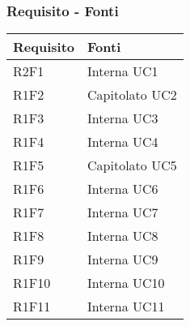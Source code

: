 \subsubsection{Requisito - Fonti}
\begin{center}
	\begin{longtable}{|p{22mm}|p{44mm}|}
		\hline
		\rowcolor{lighter-grayer}
		\textbf{Requisito} &  \textbf{Fonti}  \\
		\hline
		\endhead
		
		
		
		R2F1 &
		Interna \newline
		UC1 
		\\
		\hline
		
		R1F2 &
		Capitolato \newline
		UC2 
		\\
		\hline
		
		R1F3 &
		Interna \newline
		UC3 
		\\
		\hline
		
		R1F4 &
		Interna \newline
		UC4 
		\\
		\hline
		
		R1F5 &
		Capitolato \newline
		UC5 
		\\
		\hline
		
		R1F6 &
		Interna \newline
		UC6 
		\\
		\hline
		
		R1F7 &
		Interna \newline
		UC7 
		\\
		\hline
		
		R1F8 &
		Interna \newline
		UC8 
		\\
		\hline
		
		R1F9 &
		Interna \newline
		UC9 
		\\
		\hline
		
		R1F10 &
		Interna \newline
		UC10 
		\\
		\hline
		
		R1F11 &
		Interna \newline
		UC11 
		\\
		\hline
		

\end{longtable}
\end{center}

